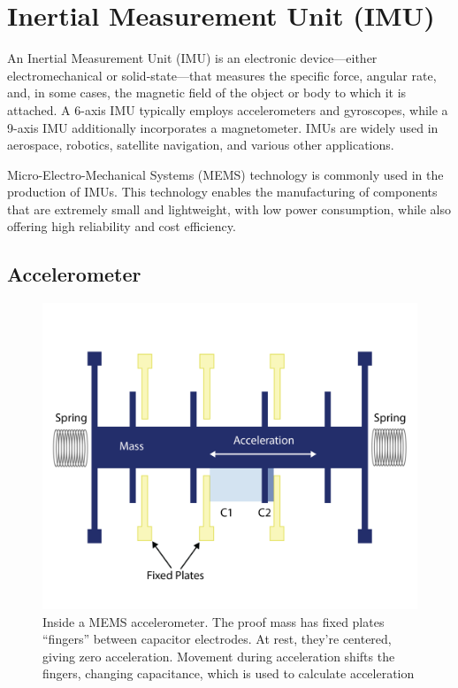 \documentclass[english, bachelor, utf8]{base/thesis_telematics}
\begin{document}
\section{Inertial Measurement Unit (IMU)}

An Inertial Measurement Unit (IMU) is an electronic device—either electromechanical or solid-state—that measures the specific force, angular rate, and, in some cases, the magnetic field of the object or body to which it is attached.
A 6-axis IMU typically employs accelerometers and gyroscopes, while a 9-axis IMU additionally incorporates a magnetometer. IMUs are widely used in aerospace, robotics, satellite navigation, and various other applications.

Micro-Electro-Mechanical Systems (MEMS) technology is commonly used in the production of IMUs. This technology enables the manufacturing of components that are extremely small and lightweight, with low power consumption, while also offering high reliability and cost efficiency. \cite{advnav_imu_intro,stanford_gps_lab_imu_testing}
\subsection{Accelerometer}

\begin{figure}[ht]
\centering
\includegraphics[width=\columnwidth]{pics/accel_inside.png}
\caption{Inside a MEMS accelerometer. The proof mass has fixed plates “fingers” between capacitor electrodes. At rest, they’re centered, giving zero acceleration. Movement during acceleration shifts the fingers, changing capacitance, which is used to calculate acceleration\cite{ericco_mems_accel_vibrations}}
\label{fig:inside_accel}
\end{figure}
\end{document}
